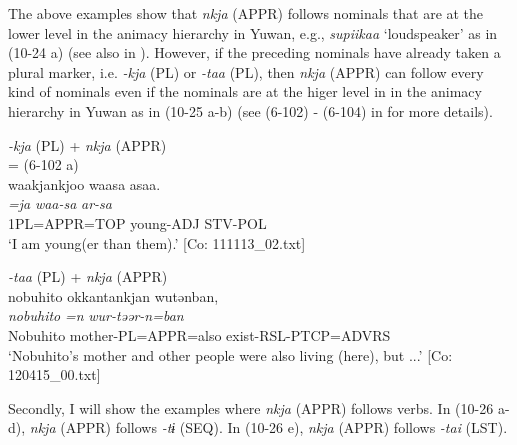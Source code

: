 The above examples show that \textit{nkja} (APPR) follows nominals that are at the lower level in the animacy hierarchy in Yuwan, e.g., \textit{supiikaa} ‘loudspeaker’ as in (10-24 a) (see also  in ). However, if the preceding nominals have already taken a plural marker, i.e. \textit{{}-kja} (PL) or \textit{{}-taa} (PL), then \textit{nkja} (APPR) can follow every kind of nominals even if the nominals are at the higer level in in the animacy hierarchy in Yuwan as in (10-25 a-b) (see (6-102) - (6-104) in  for more details).

\ea\label{ex:10.25}
\ea  \textit{{}-kja} (PL) + \textit{nkja} (APPR)\\ = (6-102 a)\\
      \glll    waakjankjoo  waasa  asaa.\\
    \textit{=ja}  \textit{waa-sa}  \textit{ar-sa}\\
    1PL=APPR=TOP  young-ADJ  STV-POL\\
\glt     ‘I am young(er than them).’  [Co: 111113\_02.txt]

 \ex\textit{{}-taa} (PL) + \textit{nkja} (APPR)\\
      \glll    nobuhito  okkantankjan  wutənban,\\
    \textit{nobuhito}  \textit{=n}  \textit{wur-təər-n=ban}\\
    Nobuhito  mother-PL=APPR=also  exist-RSL-PTCP=ADVRS\\
\glt     ‘Nobuhito’s mother and other people were also living (here), but ...’  [Co: 120415\_00.txt]
\z
\z

  Secondly, I will show the examples where \textit{nkja} (APPR) follows verbs. In (10-26 a-d), \textit{nkja} (APPR) follows \textit{{}-tɨ} (SEQ). In (10-26 e), \textit{nkja} (APPR) follows \textit{-tai} (LST).

